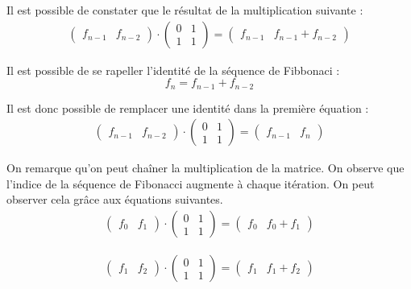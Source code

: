 \documentclass[12pt]{article}
\begin{document}
Il est possible de constater que le résultat de la multiplication suivante :
\begin{align*}
	\begin{pmatrix}
		f_{n-1} & f_{n-2}
	\end{pmatrix}
	\cdot
	\begin{pmatrix}
		0 & 1 \\
		1 & 1
	\end{pmatrix}
	=
	\begin{pmatrix}
		f_{n-1} & f_{n-1} + f_{n-2}
	\end{pmatrix}
\end{align*}

Il est possible de se rapeller l'identité de la séquence de Fibbonaci :
\[ f_{n} = f_{n-1} + f_{n-2} \]

Il est donc possible de remplacer une identité dans la première équation :
\begin{align*}
	\begin{pmatrix}
		f_{n-1} & f_{n-2}
	\end{pmatrix}
	\cdot
	\begin{pmatrix}
		0 & 1 \\
		1 & 1
	\end{pmatrix}
	=
	\begin{pmatrix}
		f_{n-1} & f_{n}
	\end{pmatrix}
\end{align*}

On remarque qu'on peut chaîner la multiplication de la matrice. On observe que l'indice de la séquence de Fibonacci augmente à chaque itération. On peut observer cela grâce aux équations suivantes.
\begin{align*}
	\begin{pmatrix}
		f_{0} & f_{1}
	\end{pmatrix}
	\cdot
	\begin{pmatrix}
		0 & 1 \\
		1 & 1
	\end{pmatrix}
	=
	\begin{pmatrix}
		f_{0} & f_{0} + f_{1}
	\end{pmatrix}
\end{align*}

\begin{align*}
	\begin{pmatrix}
		f_{1} & f_{2}
	\end{pmatrix}
	\cdot
	\begin{pmatrix}
		0 & 1 \\
		1 & 1
	\end{pmatrix}
	=
	\begin{pmatrix}
		f_{1} & f_{1} + f_{2}
	\end{pmatrix}
\end{align*}
\end{document}
